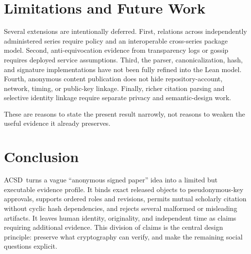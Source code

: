 \documentclass[11pt]{article}
\newcommand{\acsd}{\textsc{ACSD}}
\begin{document}
\section{Limitations and Future Work}

Several extensions are intentionally deferred. First, relations across independently administered series require policy and an interoperable cross-series package model. Second, anti-equivocation evidence from transparency logs or gossip requires deployed service assumptions. Third, the parser, canonicalization, hash, and signature implementations have not been fully refined into the Lean model. Fourth, anonymous content publication does not hide repository-account, network, timing, or public-key linkage. Finally, richer citation parsing and selective identity linkage require separate privacy and semantic-design work.

These are reasons to state the present result narrowly, not reasons to weaken the useful evidence it already preserves.

\section{Conclusion}

\acsd\ turns a vague ``anonymous signed paper'' idea into a limited but executable evidence profile. It binds exact released objects to pseudonymous-key approvals, supports ordered roles and revisions, permits mutual scholarly citation without cyclic hash dependencies, and rejects several malformed or misleading artifacts. It leaves human identity, originality, and independent time as claims requiring additional evidence. This division of claims is the central design principle: preserve what cryptography can verify, and make the remaining social questions explicit.
\end{document}
